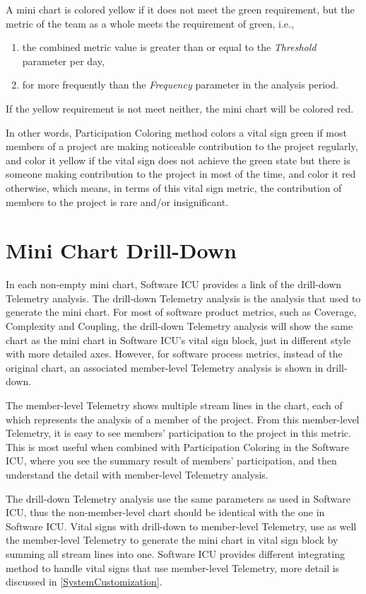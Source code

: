 A mini chart is colored yellow if it does not meet the green requirement, but the metric of the team as a whole meets the requirement of green, i.e., 
\begin{enumerate}
\item the combined metric value is greater than or equal to the {\it Threshold} parameter per day,
\item for more frequently than the {\it Frequency} parameter in the analysis period.
\end{enumerate}

If the yellow requirement is not meet neither, the mini chart will be colored red.

In other words, Participation Coloring method colors a vital sign green if most members of a project are making noticeable contribution to the project regularly, and color it yellow if the vital sign does not achieve the green state but there is someone making contribution to the project in most of the time, and color it red otherwise, which means, in terms of this vital sign metric, the contribution of members to the project is rare and/or insignificant.

\section{Mini Chart Drill-Down}
In each non-empty mini chart, Software ICU provides a link of the drill-down Telemetry analysis. The drill-down Telemetry analysis is the analysis that used to generate the mini chart. For most of software product metrics, such as Coverage, Complexity and Coupling, the drill-down Telemetry analysis will show the same chart as the mini chart in Software ICU's vital sign block, just in different style with more detailed axes. However, for software process metrics, instead of the original chart, an associated member-level Telemetry analysis is shown in drill-down. 

The member-level Telemetry shows multiple stream lines in the chart, each of which represents the analysis of a member of the project. From this member-level Telemetry, it is easy to see members' participation to the project in this metric. This is most useful when combined with Participation Coloring in the Software ICU, where you see the summary result of members' participation, and then understand the detail with member-level Telemetry analysis.

The drill-down Telemetry analysis use the same parameters as used in Software ICU, thus the non-member-level chart should be identical with the one in Software ICU. Vital signs with drill-down to member-level Telemetry, use as well the member-level Telemetry to generate the mini chart in vital sign block by summing all stream lines into one. Software ICU provides different integrating method to handle vital signs that use member-level Telemetry, more detail is discussed in \autoref{SystemCustomization}.


